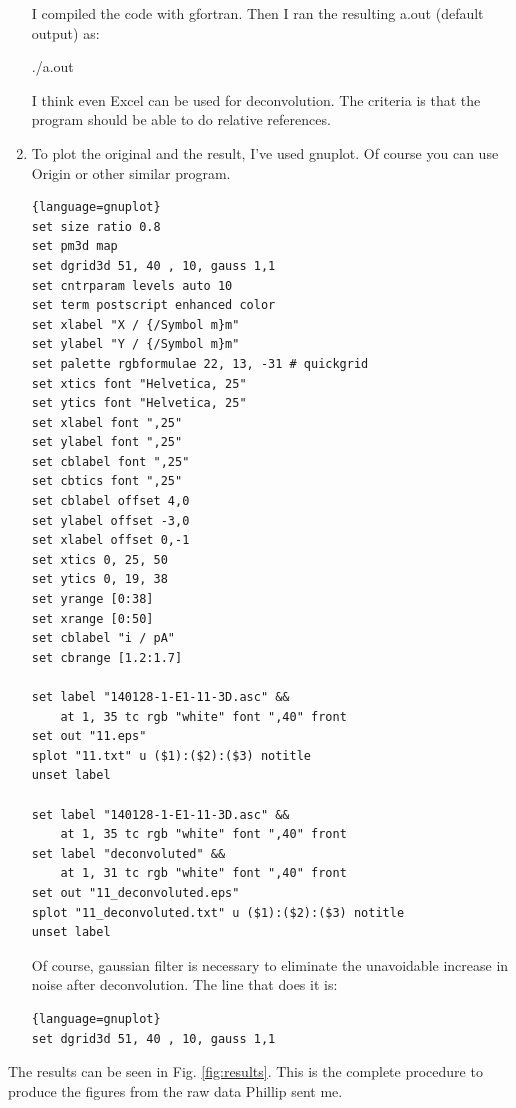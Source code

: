 \documentclass[a4paper, 11pt]{article}
\begin{document}
\begin{enumerate}
I compiled the code with gfortran. Then I ran the resulting a.out (default output) as:

./a.out

I think even Excel can be used for deconvolution. The criteria is that the program should be able to do relative references.

\item To plot the original and the result, I've used gnuplot. Of course you can use Origin or other similar program.

\begin{lstlisting}{language=gnuplot}
set size ratio 0.8
set pm3d map
set dgrid3d 51, 40 , 10, gauss 1,1
set cntrparam levels auto 10
set term postscript enhanced color
set xlabel "X / {/Symbol m}m"
set ylabel "Y / {/Symbol m}m"
set palette rgbformulae 22, 13, -31 # quickgrid
set xtics font "Helvetica, 25"
set ytics font "Helvetica, 25"
set xlabel font ",25"
set ylabel font ",25"
set cblabel font ",25"
set cbtics font ",25"
set cblabel offset 4,0
set ylabel offset -3,0
set xlabel offset 0,-1
set xtics 0, 25, 50
set ytics 0, 19, 38
set yrange [0:38]
set xrange [0:50]
set cblabel "i / pA"
set cbrange [1.2:1.7]

set label "140128-1-E1-11-3D.asc" &&
	at 1, 35 tc rgb "white" font ",40" front
set out "11.eps"
splot "11.txt" u ($1):($2):($3) notitle
unset label

set label "140128-1-E1-11-3D.asc" && 
	at 1, 35 tc rgb "white" font ",40" front
set label "deconvoluted" &&
	at 1, 31 tc rgb "white" font ",40" front
set out "11_deconvoluted.eps"
splot "11_deconvoluted.txt" u ($1):($2):($3) notitle
unset label
\end{lstlisting}

Of course, gaussian filter is necessary to eliminate the unavoidable increase in noise after deconvolution. The line that does it is:

\begin{lstlisting}{language=gnuplot}
set dgrid3d 51, 40 , 10, gauss 1,1
\end{lstlisting}

\end{enumerate}

The results can be seen in Fig. \ref{fig:results}. This is the complete procedure to produce the figures from the raw data Phillip sent me.
\end{document}

